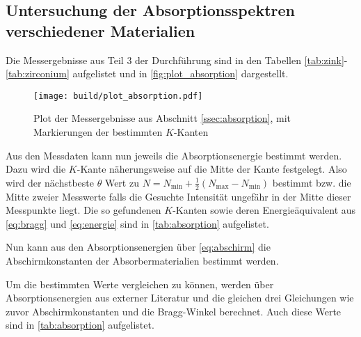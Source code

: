 \subsection{Untersuchung der Absorptionsspektren verschiedener Materialien}
\label{ssec:absorption_auswertung}

Die Messergebnisse aus Teil 3 der Durchführung sind in den Tabellen \ref{tab:zink}-\ref{tab:zirconium} aufgelistet und in \autoref{fig:plot_absorption} dargestellt.

\begin{figure}
    \centering
    \texttt{[image: build/plot\_absorption.pdf]}
    \caption{Plot der Messergebnisse aus Abschnitt \ref{ssec:absorption}, mit Markierungen der bestimmten $K$-Kanten}
    \label{fig:plot_absorption}
\end{figure}

Aus den Messdaten kann nun jeweils die Absorptionsenergie bestimmt werden.
Dazu wird die $K$-Kante näherungsweise auf die Mitte der Kante festgelegt.
Also wird der nächstbeste $\theta$ Wert zu $N=N_\text{min} + \frac{1}{2}(N_\text{max}-N_\text{min})$ bestimmt bzw. die Mitte zweier Messwerte falls die Gesuchte Intensität ungefähr in der Mitte dieser Messpunkte liegt.
Die so gefundenen $K$-Kanten sowie deren Energieäquivalent aus \autoref{eq:bragg} und \ref{eq:energie} sind in \autoref{tab:absorption} aufgelistet.

Nun kann aus den Absorptionsenergien über \autoref{eq:abschirm} die Abschirmkonstanten der Absorbermaterialien bestimmt werden.

Um die bestimmten Werte vergleichen zu können, werden über Absorptionsenergien aus externer Literatur und die gleichen drei Gleichungen wie zuvor Abschirmkonstanten und die Bragg-Winkel berechnet.
Auch diese Werte sind in \autoref{tab:absorption} aufgelistet.

